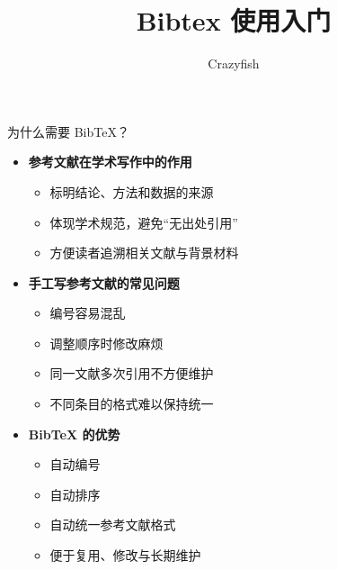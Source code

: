 \documentclass[aspectratio=169,UTF8,11pt]{ctexbeamer}
\title{Bibtex 使用入门}
\author{Crazyfish}
\institute{ZJU MATH}
\date
\begin{document}
\begin{frame}
  \titlepage
\end{frame}

\begin{frame}{为什么需要 BibTeX？}

\begin{itemize}
  \item \textbf{参考文献在学术写作中的作用}
  \begin{itemize}
    \item 标明结论、方法和数据的来源
    \item 体现学术规范，避免“无出处引用”
    \item 方便读者追溯相关文献与背景材料
  \end{itemize}

  \vspace{0.5em}
  \item \textbf{手工写参考文献的常见问题}
  \begin{itemize}
    \item 编号容易混乱
    \item 调整顺序时修改麻烦
    \item 同一文献多次引用不方便维护
    \item 不同条目的格式难以保持统一
  \end{itemize}

  \vspace{0.5em}
  \item \textbf{BibTeX 的优势}
  \begin{itemize}
    \item 自动编号
    \item 自动排序
    \item 自动统一参考文献格式
    \item 便于复用、修改与长期维护
  \end{itemize}
\end{itemize}

\end{frame}
\end{document}
